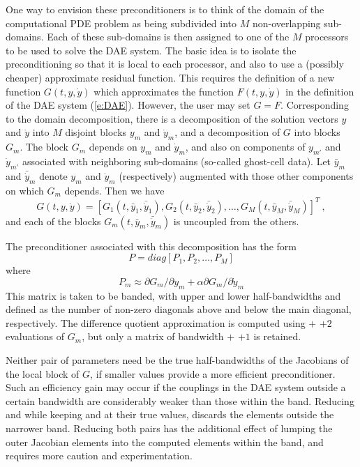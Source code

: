 {
One way to envision these preconditioners is to think of the domain of
the computational PDE problem as being subdivided into $M$ non-overlapping
sub-domains.  Each of these sub-domains is then assigned to one of the
$M$ processors to be used to solve the DAE system. The basic idea is
to isolate the preconditioning so that it is local to each processor,
and also to use a (possibly cheaper) approximate residual
function. This requires the definition of a new function $G(t,y,\dot{y})$
which approximates the function $F(t, y, \dot{y})$ in the definition of the DAE
system (\ref{e:DAE}). However, the user may set $G = F$.  Corresponding
to the domain decomposition, there is a decomposition of the solution
vectors $y$ and $\dot{y}$ into $M$ disjoint blocks $y_m$ and $\dot{y}_m$, and a
decomposition of $G$ into blocks $G_m$.  The block $G_m$ depends on $y_m$
and $\dot{y}_m$, and also on components of $y_{m'}$ and $\dot{y}_{m'}$ associated with
neighboring sub-domains (so-called ghost-cell data).  Let $\bar{y}_m$
and $\bar{\dot{y}}_m$ denote $y_m$ and $\dot{y}_m$ (respectively) augmented
with those other components on which $G_m$ depends.  Then we have
\begin{equation}
  G(t,y,\dot{y}) = [G_1(t,\bar{y}_1,\bar{\dot{y}}_1), G_2(t,\bar{y}_2,\bar{\dot{y}}_2),
               \ldots, G_M(t,\bar{y}_M,\bar{\dot{y}}_M)]^T ~,
\end{equation}
and each of the blocks $G_m(t,\bar{y}_m,\bar{\dot{y}}_m)$ is uncoupled from
the others.

The preconditioner associated with this decomposition has the form 
\begin{equation}
  P= diag[P_1, P_2, \ldots, P_M]
\end{equation}
where 
\begin{equation}
  P_m \approx \partial G_m / \partial y_m
  + \alpha \partial G_m / \partial \dot{y}_m
\end{equation}
This matrix is taken to be banded, with
upper and lower half-bandwidths  and  defined as
the number of non-zero diagonals above and below the main diagonal,
respectively. The difference quotient approximation is computed using
 $+$  $+ 2$ evaluations of $G_m$, but only a matrix
of bandwidth  $+$  $+ 1$ is retained.

Neither pair of parameters need be the true half-bandwidths of the Jacobians
of the local block of $G$, if smaller values provide a more efficient
preconditioner.  Such an efficiency gain may occur if the couplings
in the DAE system outside a certain bandwidth are considerably weaker than
those within the band.  Reducing  and  while keeping
 and  at their true values, discards the elements
outside the narrower band.  Reducing both pairs has the additional
effect of lumping the outer Jacobian elements into the computed elements
within the band, and requires more caution and experimentation.

}
